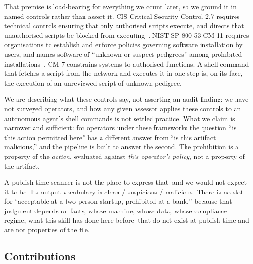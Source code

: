 \documentclass[10pt]{article}
\begin{document}
That premise is load-bearing for everything we count later, so we ground it in named
controls rather than assert it. CIS Critical Security Control 2.7 requires technical
controls ensuring that only authorised scripts execute, and directs that unauthorised
scripts be blocked from executing~\cite{cisv8}. NIST SP 800-53 CM-11 requires
organisations to establish and enforce policies governing software installation by
users, and names software of ``unknown or suspect pedigrees'' among prohibited
installations~\cite{nist80053}. CM-7 constrains systems to authorised functions.
A shell command that fetches a script from the network and executes it in one step
is, on its face, the execution of an unreviewed script of unknown pedigree.

We are describing what these controls say, not asserting an audit finding: we have
not surveyed operators, and how any given assessor applies these controls to an
autonomous agent's shell commands is not settled practice. What we claim is narrower
and sufficient: for operators under these frameworks the question ``is this action
permitted here'' has a different answer from ``is this artifact malicious,'' and the
pipeline is built to answer the second. The prohibition is a property of the
\emph{action}, evaluated against \emph{this operator's policy}, not a property of the
artifact.

A publish-time scanner is not the place to express that, and we would not expect it to
be. Its output vocabulary is clean / suspicious / malicious. There is no slot for ``acceptable at a two-person
startup, prohibited at a bank,'' because that judgment depends on facts, whose
machine, whose data, whose compliance regime, what this skill has done here
before, that do not exist at publish time and are not properties of the file.

\subsection{Contributions}
\end{document}
